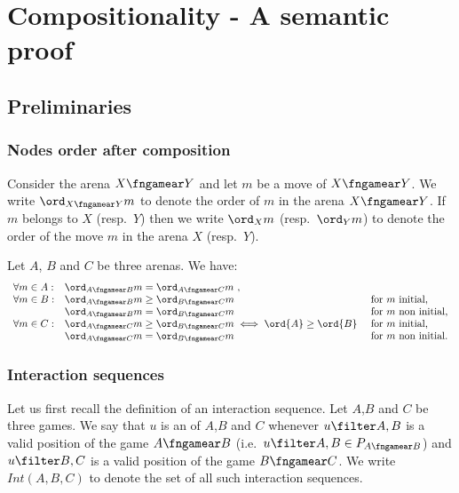 \section{Compositionality - A semantic proof}

\subsection{Preliminaries}
 
\subsubsection{Nodes order after composition}

Consider the arena $X\fngamear Y$
and let $m$ be a move of $X\fngamear Y$.
We write $\ord_{X\fngamear Y}{m}$
to denote the order of 
$m$ in the arena ${X\fngamear Y}$.
If $m$ belongs to $X$ (resp.~$Y$) then
we write $\ord_X{m}$ 
(resp.~$\ord_Y{m}$) to denote the order of the move $m$ in the arena $X$ (resp.~$Y$).

\begin{lemma}
\label{lem:compositionorder}
Let $A$, $B$ and $C$ be three arenas. We have:
$$\begin{array}{lll}
\forall m \in A:
    &  \ord_{A\fngamear B}{m} = \ord_{A\fngamear C}{m} \ ,\\
\forall m \in B:
    & \ord_{A\fngamear B}{m} \geq \ord_{B\fngamear C}{m}  & \mbox{for $m$ initial,}\\
    & \ord_{A\fngamear B}{m} = \ord_{B\fngamear C}{m} & \mbox{for $m$ non initial,} \\
\forall m \in C:
    & \ord_{A\fngamear C}{m} \geq \ord_{B\fngamear C}{m} \iff
\ord{A} \geq \ord{B}\ & \mbox{for $m$ initial,}\\
    & \ord_{A\fngamear C}{m} = \ord_{B\fngamear C}{m}   & \mbox{for $m$ non initial.}
\end{array}
$$
\end{lemma}





\subsubsection{Interaction sequences}
Let us first recall the definition of an interaction sequence.
Let $A$,$B$ and $C$ be three games. 
We say that $u$  is an  of $A$,$B$ and $C$ whenever $u\filter A,B$ is a valid position of the game $A\fngamear B$
(i.e.~$u\filter A,B \in P_{A\fngamear B}$) 
and  $u\filter B,C$ is a valid position of the game
$B\fngamear C$. We write $Int(A,B,C)$ to denote
the set of all such interaction sequences.

